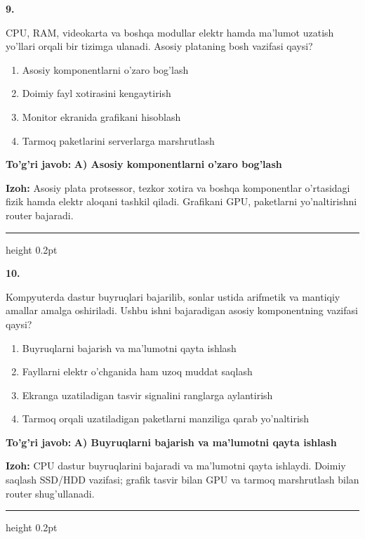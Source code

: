 \documentclass[10pt,a4paper]{article}
\begin{document}
{\bfseries\sffamily\color{ink} 9.}
\par
CPU, RAM, videokarta va boshqa modullar elektr hamda ma'lumot uzatish yo'llari orqali bir tizimga ulanadi. Asosiy plataning bosh vazifasi qaysi?
\begin{enumerate}[label=\Alph*),leftmargin=9mm]
\item Asosiy komponentlarni o'zaro bog'lash
\item Doimiy fayl xotirasini kengaytirish
\item Monitor ekranida grafikani hisoblash
\item Tarmoq paketlarini serverlarga marshrutlash
\end{enumerate}
\begin{tcolorbox}[enhanced,breakable,colback=teal!4,colframe=teal!60!black,boxrule=0.45pt,arc=1.2mm,left=2.7mm,right=2.7mm,top=1.8mm,bottom=1.8mm,before skip=2mm,after skip=2mm]
{\bfseries\sffamily\color{teal}To'g'ri javob:} \textbf{A) Asosiy komponentlarni o'zaro bog'lash}
\par\smallskip
{\bfseries Izoh:} Asosiy plata protsessor, tezkor xotira va boshqa komponentlar o'rtasidagi fizik hamda elektr aloqani tashkil qiladi. Grafikani GPU, paketlarni yo'naltirishni router bajaradi.
\end{tcolorbox}
\vspace{2mm}\hrule height 0.2pt\vspace{3mm}

{\bfseries\sffamily\color{ink} 10.}
\par
Kompyuterda dastur buyruqlari bajarilib, sonlar ustida arifmetik va mantiqiy amallar amalga oshiriladi. Ushbu ishni bajaradigan asosiy komponentning vazifasi qaysi?
\begin{enumerate}[label=\Alph*),leftmargin=9mm]
\item Buyruqlarni bajarish va ma'lumotni qayta ishlash
\item Fayllarni elektr o'chganida ham uzoq muddat saqlash
\item Ekranga uzatiladigan tasvir signalini ranglarga aylantirish
\item Tarmoq orqali uzatiladigan paketlarni manziliga qarab yo'naltirish
\end{enumerate}
\begin{tcolorbox}[enhanced,breakable,colback=teal!4,colframe=teal!60!black,boxrule=0.45pt,arc=1.2mm,left=2.7mm,right=2.7mm,top=1.8mm,bottom=1.8mm,before skip=2mm,after skip=2mm]
{\bfseries\sffamily\color{teal}To'g'ri javob:} \textbf{A) Buyruqlarni bajarish va ma'lumotni qayta ishlash}
\par\smallskip
{\bfseries Izoh:} CPU dastur buyruqlarini bajaradi va ma'lumotni qayta ishlaydi. Doimiy saqlash SSD/HDD vazifasi; grafik tasvir bilan GPU va tarmoq marshrutlash bilan router shug'ullanadi.
\end{tcolorbox}
\vspace{2mm}\hrule height 0.2pt\vspace{3mm}
\end{document}
